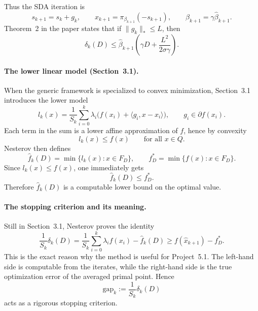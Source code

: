 \documentclass[12pt,a4paper]{article}
\begin{document}
Thus the SDA iteration is
\begin{equation}
    s_{k+1} = s_k + g_k,
    \qquad
    x_{k+1} = \pi_{\beta_{k+1}}(-s_{k+1}),
    \qquad
    \beta_{k+1} = \gamma \hat{\beta}_{k+1}.
\end{equation}
Theorem~2 in the paper states that if $\|g_k\|_* \le L$, then
\begin{equation}
    \delta_k(D) \le \hat{\beta}_{k+1}\left(\gamma D + \frac{L^2}{2\sigma\gamma}\right).
    \label{eq:sda-delta}
\end{equation}

\paragraph{The lower linear model (Section~3.1).}
When the generic framework is specialized to convex minimization, Section~3.1 introduces the lower model
\begin{equation}
    l_k(x)
    =
    \frac{1}{S_k}
    \sum_{i=0}^k \lambda_i\bigl(f(x_i) + \langle g_i, x-x_i \rangle\bigr),
    \qquad g_i \in \partial f(x_i).
\end{equation}
Each term in the sum is a lower affine approximation of $f$, hence by convexity
\begin{equation}
    l_k(x) \le f(x) \qquad \text{for all } x \in Q.
\end{equation}
Nesterov then defines
\begin{equation}
    \hat{f}_k(D) = \min\{ l_k(x) : x \in F_D \},
    \qquad
    f_D^* = \min\{ f(x) : x \in F_D \}.
\end{equation}
Since $l_k(x) \le f(x)$, one immediately gets
\begin{equation}
    \hat{f}_k(D) \le f_D^*.
\end{equation}
Therefore $\hat{f}_k(D)$ is a computable lower bound on the optimal value.

\paragraph{The stopping criterion and its meaning.}
Still in Section~3.1, Nesterov proves the identity
\begin{equation}
    \frac{1}{S_k}\delta_k(D)
    =
    \frac{1}{S_k}\sum_{i=0}^k \lambda_i f(x_i) - \hat{f}_k(D)
    \ge
    f(\hat{x}_{k+1}) - f_D^*.
    \label{eq:main-stopping}
\end{equation}
This is the exact reason why the method is useful for Project~5.1. The left-hand side is computable from the iterates, while the right-hand side is the true optimization error of the averaged primal point. Hence
\begin{equation}
    \mathrm{gap}_k := \frac{1}{S_k}\delta_k(D)
\end{equation}
acts as a rigorous stopping criterion.
\end{document}

